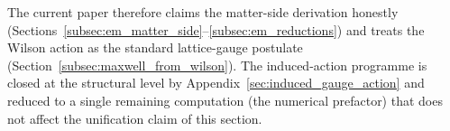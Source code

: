 The current paper therefore claims the matter-side derivation
honestly (Sections~\ref{subsec:em_matter_side}--\ref{subsec:em_reductions})
and treats the Wilson action as the standard lattice-gauge postulate
(Section~\ref{subsec:maxwell_from_wilson}).  The induced-action
programme is closed at the structural level by
Appendix~\ref{sec:induced_gauge_action} and reduced to a single
remaining computation (the numerical prefactor) that does not affect
the unification claim of this section.
